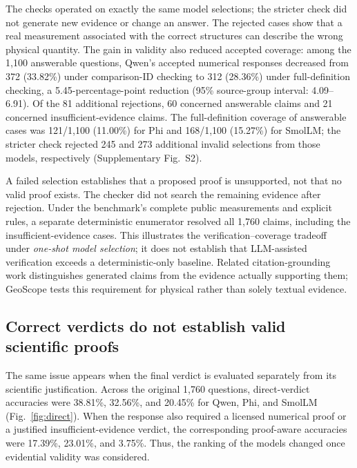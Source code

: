The checks operated on exactly the same model selections; the stricter check did not generate new evidence or change an answer. The rejected cases show that a real measurement associated with the correct structures can describe the wrong physical quantity. The gain in validity also reduced accepted coverage: among the 1,100 answerable questions, Qwen's accepted numerical responses decreased from 372 (33.82\%) under comparison-ID checking to 312 (28.36\%) under full-definition checking, a 5.45-percentage-point reduction (95\% source-group interval: 4.09--6.91). Of the 81 additional rejections, 60 concerned answerable claims and 21 concerned insufficient-evidence claims. The full-definition coverage of answerable cases was 121/1,100 (11.00\%) for Phi and 168/1,100 (15.27\%) for SmolLM; the stricter check rejected 245 and 273 additional invalid selections from those models, respectively (Supplementary Fig.~S2).

A failed selection establishes that a proposed proof is unsupported, not that no valid proof exists. The checker did not search the remaining evidence after rejection. Under the benchmark's complete public measurements and explicit rules, a separate deterministic enumerator resolved all 1,760 claims, including the insufficient-evidence cases. This illustrates the verification--coverage tradeoff under \emph{one-shot model selection}; it does not establish that LLM-assisted verification exceeds a deterministic-only baseline. Related citation-grounding work distinguishes generated claims from the evidence actually supporting them; GeoScope tests this requirement for physical rather than solely textual evidence.\cite{gao2023enabling,yu2026scicueval}

\subsection{Correct verdicts do not establish valid scientific proofs}
\label{sec:direct_results}

The same issue appears when the final verdict is evaluated separately from its scientific justification. Across the original 1,760 questions, direct-verdict accuracies were 38.81\%, 32.56\%, and 20.45\% for Qwen, Phi, and SmolLM (Fig.~\ref{fig:direct}). When the response also required a licensed numerical proof or a justified insufficient-evidence verdict, the corresponding proof-aware accuracies were 17.39\%, 23.01\%, and 3.75\%. Thus, the ranking of the models changed once evidential validity was considered.

